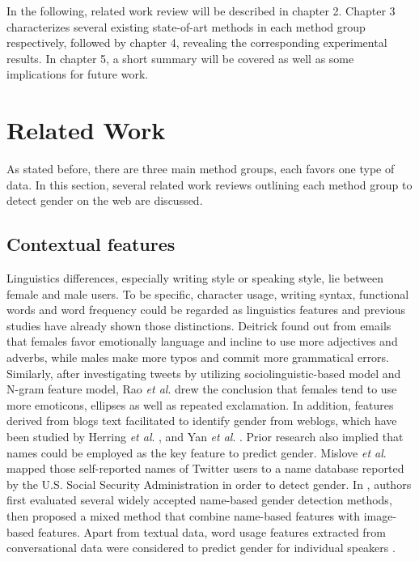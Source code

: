 \documentclass[runningheads]{llncs}
\begin{document}
	In the following, related work review will be described in chapter 2. Chapter 3 characterizes several existing state-of-art methods in each method group respectively, followed by chapter 4, revealing the corresponding experimental results. In chapter 5, a short summary will be covered as well as some implications for future work. 

	
	\section{Related Work}
	
	As stated before, there are three main method groups, each favors one type of data. In this section, several related work reviews outlining each method group to detect gender on the web are discussed. 
	
	\subsection{Contextual features}
	
	Linguistics differences, especially writing style or speaking style, lie between female and male users. To be specific, character usage, writing syntax, functional words and word frequency could be regarded as linguistics features \cite{deitrick2012author} and previous studies have already shown those distinctions. Deitrick \cite{deitrick2012author} found out from emails that females favor emotionally language and incline to use more adjectives and adverbs, while males make more typos and commit more grammatical errors. Similarly, after investigating tweets by utilizing sociolinguistic-based model and N-gram feature model, Rao \textit{et al}. \cite{rao2010classifying} drew the conclusion that females tend to use more emoticons, ellipses as well as repeated exclamation. In addition, features derived from blogs text facilitated to identify gender from weblogs, which have been studied by Herring \textit{et al}. \cite{herring2004bridging}, and Yan \textit{et al}. \cite{yan2006gender}. Prior research also implied that names could be employed as the key feature to predict gender. Mislove \textit{et al}. \cite{mislove2011understanding} mapped those self-reported names of Twitter users to a name database reported by the U.S. Social Security Administration in order to detect gender.  In \cite{karimi2016inferring}, authors first evaluated several widely accepted name-based gender detection methods, then proposed a mixed method that combine name-based features with image-based features. Apart from textual data, word usage features extracted from conversational data were considered  to predict gender for individual speakers \cite{gillick2010can}. 
	
\end{document}
